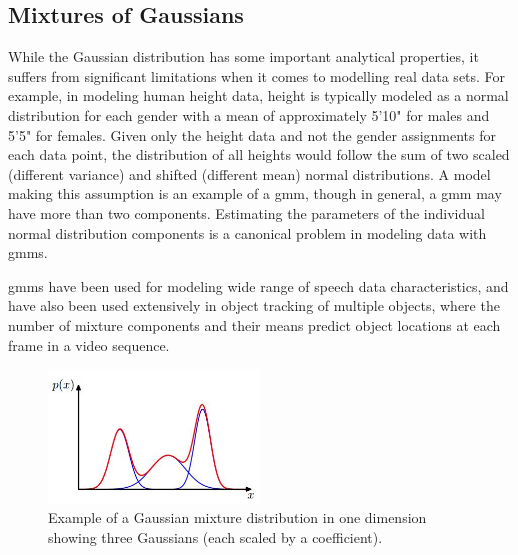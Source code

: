 \documentclass[12pt, a4paper, twoside]{report}
\begin{document}
\subsection{Mixtures of Gaussians}
While the Gaussian distribution has some important analytical properties, it suffers from significant limitations when it comes to modelling real data sets. For example, in modeling human height data, height is typically modeled as a normal distribution for each gender with a mean of approximately 5'10" for males and 5'5" for females. Given only the height data and not the gender assignments for each data point, the distribution of all heights would follow the sum of two scaled (different variance) and shifted (different mean) normal distributions. A model making this assumption is an example of a \acrshort{gmm}, though in general, a \acrshort{gmm} may have more than two components. Estimating the parameters of the individual normal distribution components is a canonical problem in modeling data with \acrshort{gmm}s.
\par
\acrshort{gmm}s have been used for modeling wide range of speech data characteristics, and have also been used extensively in object tracking of multiple objects, where the number of mixture components and their means predict object locations at each frame in a video sequence.
\begin{figure}[!h]
	\centering
	\includegraphics[width=0.5\textwidth]
	{images/chapter4/gmm-scaled-gauss}
	\caption{Example of a Gaussian mixture distribution in one dimension showing three Gaussians (each scaled by a coefficient).}
	\label{fig:gmm-scaled-gauss}
\end{figure}
\end{document}
